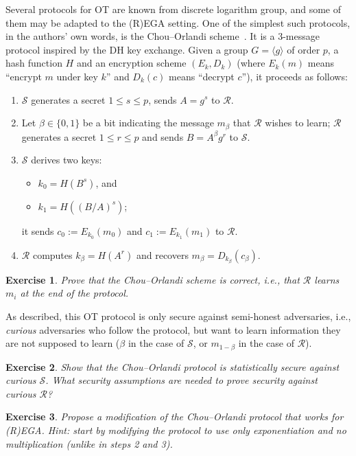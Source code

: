 \documentclass{article}
\newtheorem{ex}{Exercise}
\begin{document}
Several protocols for OT are known from discrete logarithm group, and
some of them may be adapted to the (R)EGA setting.  One of the
simplest such protocols, in the authors' own words, is the
Chou--Orlandi scheme~\cite{LC:ChoOrl15}.  It is a 3-message protocol
inspired by the DH key exchange.  Given a group $G=\langle g\rangle$
of order $p$, a hash function $H$ and an encryption scheme $(E_k,D_k)$
(where $E_k(m)$ means ``encrypt $m$ under key $k$'' and $D_k(c)$ means
``decrypt $c$''), it proceeds as follows:

\begin{enumerate}
\item $\mathcal{S}$ generates a secret $1\le s\le p$, sends $A = g^s$
  to $\mathcal{R}$.
\item Let $\beta\in\{0,1\}$ be a bit indicating the message $m_\beta$
  that $\mathcal{R}$ wishes to learn; $\mathcal{R}$ generates a secret
  $1\le r\le p$ and sends $B = A^\beta g^r$ to $\mathcal{S}$.
\item $\mathcal{S}$ derives two keys:
  \begin{itemize}
  \item $k_0 = H(B^s)$, and
  \item $k_1 = H((B/A)^s)$;
  \end{itemize}
  it sends $c_0 := E_{k_0}(m_0)$ and $c_1 := E_{k_1}(m_1)$ to
  $\mathcal{R}$.
\item $\mathcal{R}$ computes $k_\beta = H(A^r)$ and recovers
  $m_\beta = D_{k_\beta}(c_\beta)$.
\end{enumerate}

\begin{ex}
  Prove that the Chou--Orlandi scheme is correct, i.e., that
  $\mathcal{R}$ learns $m_i$ at the end of the protocol.
\end{ex}

As described, this OT protocol is only secure against semi-honest
adversaries, i.e., \emph{curious} adversaries who follow the protocol,
but want to learn information they are not supposed to learn ($\beta$
in the case of $\mathcal{S}$, or $m_{1-\beta}$ in the case of
$\mathcal{R}$).

\begin{ex}
  Show that the Chou--Orlandi protocol is statistically secure against
  curious $\mathcal{S}$.  What security assumptions are needed to
  prove security against curious $\mathcal{R}$?
\end{ex}

\begin{ex}
  Propose a modification of the Chou--Orlandi protocol that works for
  (R)EGA.  \emph{Hint: start by modifying the protocol to use only
    exponentiation and no multiplication (unlike in steps 2 and 3).}
\end{ex}
\end{document}

